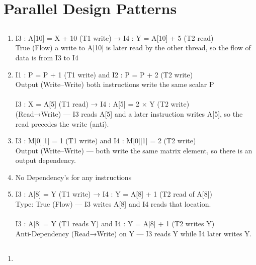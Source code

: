 \documentclass[12pt]{article}
\begin{document}
\section{Parallel Design Patterns}

\subsection{}
\begin{enumerate}
	\item 
	I3 : A[10] = X + 10 (T1 write) → I4 : Y = A[10] + 5 (T2 read)\\
	True (Flow) a write to A[10] is later read by the other thread, so the flow of data is from I3 to I4
	
	\item I1 : P = P + 1 (T1 write) and I2 : P = P + 2 (T2 write) \\
	Output (Write–Write) both instructions write the same scalar P\\~\\
	I3 : X = A[5] (T1 read) → I4 : A[5] = 2 × Y (T2 write)\\
	(Read→Write) — I3 reads A[5] and a later instruction writes A[5], so the read precedes the write (anti).\\
	
	\item I3 : M[0][1] = 1 (T1 write) and I4 : M[0][1] = 2 (T2 write)\\
	Output (Write–Write) — both write the same matrix element, so there is an output dependency.
	
	\item No Dependency's for any instructions
	
	\item I3 : A[8] = Y (T1 write) → I4 : Y = A[8] + 1 (T2 read of A[8])\\
	Type: True (Flow) — I3 writes A[8] and I4 reads that location.\\~\\
	
	I3 : A[8] = Y (T1 reads Y) and I4 : Y = A[8] + 1 (T2 writes Y)\\
	Anti-Dependency (Read→Write) on Y — I3 reads Y while I4 later writes Y.
\end{enumerate}

\subsection{}
\begin{enumerate}
	\item 
\end{enumerate}
\end{document}
